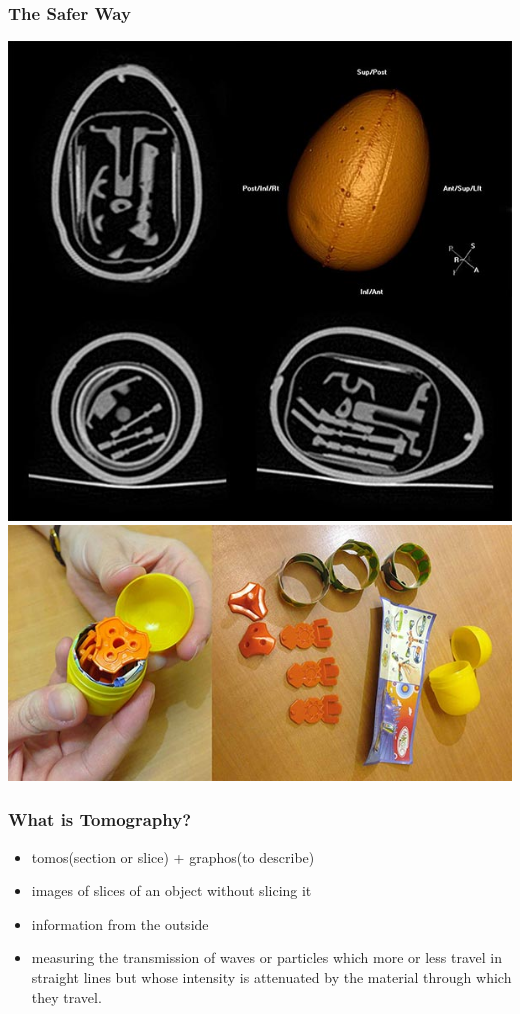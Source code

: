 \documentclass{beamer}
\begin{document}
\begin{frame}
\frametitle{The Safer Way}
\includegraphics[scale=0.25]{media/kinder_egg_ct_slices.jpg}
\hspace{10mm}
		\includegraphics[scale=0.25]{media/kinder_egg_opened.jpg}
\end{frame}

\begin{frame}
	\frametitle{What is Tomography? }
	\begin{itemize}
		\item tomos(section or slice) + graphos(to describe)
		 \pause
	\item images of slices of an object without slicing it
	\item information from the outside 
		 \pause
	\item measuring the transmission of waves or
particles which more or less travel in straight lines but whose intensity is attenuated by
the material through which they travel.
	\end{itemize}

\end{frame}
\end{document}
